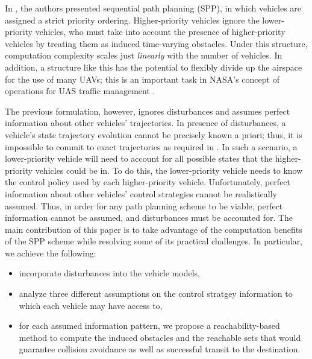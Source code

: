 In \cite{Chen15}, the authors presented sequential path planning (SPP), in which vehicles are assigned a strict priority ordering. Higher-priority vehicles ignore the lower-priority vehicles, who must take into account the presence of higher-priority vehicles by treating them as induced time-varying obstacles. Under this structure, computation complexity scales just \textit{linearly} with the number of vehicles. In addition, a structure like this has the potential to flexibly divide up the airspace for the use of many UAVs; this is an important task in NASA's concept of operations for UAS traffic management \cite{Kopardekar16}. 

The previous formulation, however, ignores disturbances and assumes perfect information about other vehicles' trajectories. In presence of disturbances, a vehicle's state trajectory evolution cannot be precisely known a priori; thus, it is impossible to commit to exact trajectories as required in \cite{Chen15}. In such a scenario, a lower-priority vehicle will need to account for all possible states that the higher-priority vehicles could be in. To do this, the lower-priority vehicle needs to know the control policy used by each higher-priority vehicle. Unfortunately, perfect information about other vehicles' control strategies cannot be realistically assumed. Thus, in order for any path planning scheme to be viable, perfect information cannot be assumed, and disturbances must be accounted for. The main contribution of this paper is to take advantage of the computation benefits of the SPP scheme while resolving some of its practical challenges. In particular, we achieve the following:
\begin{itemize}
\item incorporate disturbances into the vehicle models,
\item analyze three different assumptions on the control stratgey information to which each vehicle may have access to,
\item for each assumed information pattern, we propose a reachability-based method to compute the induced obstacles and the reachable sets that would guarantee collision avoidance as well as successful transit to the destination.
\end{itemize}